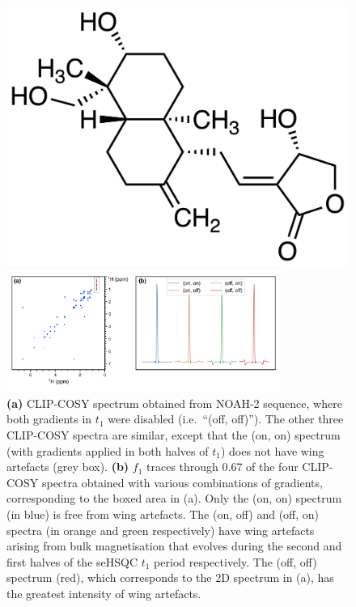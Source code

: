 \begin{figure}
    \centering
    \includegraphics{./figures/andro.png}

    \includegraphics[width=0.8\textwidth]{./figures/wing_gradients.png}
    \caption{
        \textbf{(a)} CLIP-COSY spectrum obtained from NOAH-2  sequence, where both gradients in $t_1$ were disabled (i.e.\ ``(off, off)'').
        The other three CLIP-COSY spectra are similar, except that the (on, on) spectrum (with gradients applied in both halves of $t_1$) does not have wing artefacts (grey box).
        \textbf{(b)} $f_1$ traces through \SI{0.67}{\ppm} of the four CLIP-COSY spectra obtained with various combinations of gradients, corresponding to the boxed area in (a).
        Only the (on, on) spectrum (in blue) is free from wing artefacts.
        The (on, off) and (off, on) spectra (in orange and green respectively) have wing artefacts arising from bulk magnetisation that evolves during the second and first halves of the seHSQC $t_1$ period respectively.
        The (off, off) spectrum (red), which corresponds to the 2D spectrum in (a), has the greatest intensity of wing artefacts.
        \andro{}
    }
    \label{fig:wing_gradients}
\end{figure}


